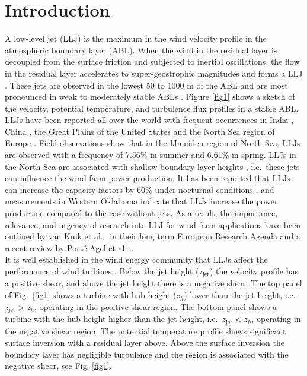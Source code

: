 \documentclass[%
 aip,
 amsmath,amssymb,
reprint,
twocolumn,%
author-numerical,%
]{revtex4-1}
\begin{document}
\section{Introduction}\label{sec1}
{\color{black} A low-level jet (LLJ) is the maximum in the wind velocity profile in the atmospheric boundary layer (ABL). {\color{black}When the wind in the residual layer\cite{bru82} is decoupled from the surface friction and subjected to inertial oscillations, the flow in the residual layer accelerates to super-geostrophic magnitudes and forms a LLJ \cite{bla57}.} These jets are observed in the lowest 50 to 1000 m of the ABL \citep{sme96} and are most pronounced in weak to moderately stable ABLs \cite{baa09, ban08}.} Figure \ref{fig1} shows a sketch of the velocity, potential temperature, and turbulence flux profiles in a stable ABL. LLJs \cite{kel04, ban02, sme93} have been reported all over the world with frequent occurrences in India \cite{pra11}, China \cite{liu14}, the Great Plains of the United States \cite{arr97} and the North Sea region of Europe \cite{kal19, wag19}. Field observations show that in the IJmuiden region of North Sea, LLJs are observed with a frequency of 7.56\% in summer and 6.61\% in spring\cite{dun18, kal17}. {\color{black} LLJs in the North Sea are associated with shallow boundary-layer heights \cite{dun18, baa09}, i.e.\ these jets can influence the wind farm power production. It has been reported that LLJs can increase the capacity factors by 60\% under nocturnal conditions \cite{wil15b}, and measurements in Western Oklahoma\cite{gre09} indicate that LLJs increase the power production compared to the case without jets.} As a result, the importance, relevance, and urgency of research into LLJ for wind farm applications have been outlined by van Kuik et al.\ \cite{kui16} in their long term European Research Agenda and a recent review by Port\'e-Agel et al.\ \cite{por20}.\\
\indent It is well established in the wind energy community that LLJs affect the performance of wind turbines \cite{sis78}. Below the jet height ($z_\text{jet}$) the velocity profile has a positive shear, and above the jet height there is a negative shear. The top panel of Fig.\ \ref{fig1} shows a turbine with hub-height ($z_h$) lower than the jet height, i.e.\ $z_\text{jet} > z_h$, operating in the positive shear region. The bottom panel shows a turbine with the hub-height higher than the jet height, i.e.\ $z_\text{jet} < z_h$, operating in the negative shear region. The potential temperature profile shows significant surface inversion with a residual layer above. Above the surface inversion the boundary layer has negligible turbulence and the region is associated with the negative shear, see Fig. \ref{fig1}.\\
\end{document}
